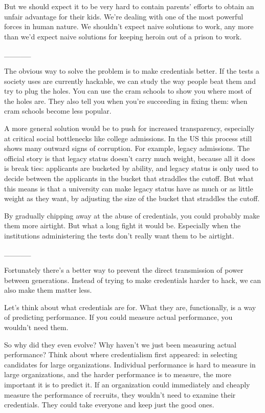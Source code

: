 \documentclass[12pt]{book}
\begin{document}
But we should expect it to be very hard to contain parents' efforts to
obtain an unfair advantage for their kids. We're dealing with one of the
most powerful forces in human nature. We shouldn't expect naive
solutions to work, any more than we'd expect naive solutions for keeping
heroin out of a prison to work.

\_\_\_\_\_

The obvious way to solve the problem is to make credentials better. If
the tests a society uses are currently hackable, we can study the way
people beat them and try to plug the holes. You can use the cram schools
to show you where most of the holes are. They also tell you when you're
succeeding in fixing them: when cram schools become less popular.

A more general solution would be to push for increased transparency,
especially at critical social bottlenecks like college admissions. In
the US this process still shows many outward signs of corruption. For
example, legacy admissions. The official story is that legacy status
doesn't carry much weight, because all it does is break ties: applicants
are bucketed by ability, and legacy status is only used to decide
between the applicants in the bucket that straddles the cutoff. But what
this means is that a university can make legacy status have as much or
as little weight as they want, by adjusting the size of the bucket that
straddles the cutoff.

By gradually chipping away at the abuse of credentials, you could
probably make them more airtight. But what a long fight it would be.
Especially when the institutions administering the tests don't really
want them to be airtight.

\_\_\_\_\_

Fortunately there's a better way to prevent the direct transmission of
power between generations. Instead of trying to make credentials harder
to hack, we can also make them matter less.

Let's think about what credentials are for. What they are, functionally,
is a way of predicting performance. If you could measure actual
performance, you wouldn't need them.

So why did they even evolve? Why haven't we just been measuring actual
performance? Think about where credentialism first appeared: in
selecting candidates for large organizations. Individual performance is
hard to measure in large organizations, and the harder performance is to
measure, the more important it is to predict it. If an organization
could immediately and cheaply measure the performance of recruits, they
wouldn't need to examine their credentials. They could take everyone and
keep just the good ones.
\end{document}
